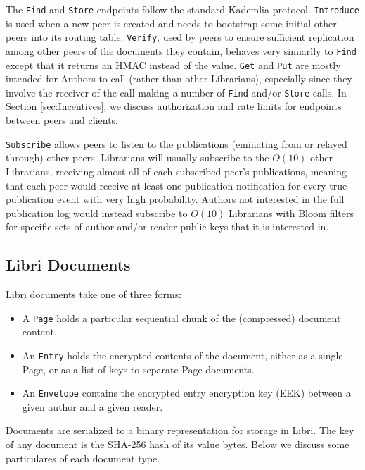 \documentclass[10pt]{article}
\newcommand{\ttt}[1]{\texttt{#1}}
\def\Entry{\ttt{Entry}}
\def\Page{\ttt{Page}}
\def\Envelope{\ttt{Envelope}}
\def\Put{\ttt{Put}}
\def\Get{\ttt{Get}}
\begin{document}
The \ttt{Find} and \texttt{Store} endpoints follow the standard Kademlia protocol. \texttt{Introduce} is used when a new peer is created and needs to bootstrap some initial other peers into its routing table. \texttt{Verify}, used by peers to ensure sufficient replication among other peers of the documents they contain, behaves very simiarlly to \texttt{Find} except that it returns an HMAC instead of the value. \Get{} and \Put{} are mostly intended for Authors to call (rather than other Librarians), especially since they involve the receiver of the call making a number of \texttt{Find} and/or \texttt{Store} calls. In Section \ref{sec:Incentives}, we discuss authorization and rate limits for endpoints between peers and clients.

\ttt{Subscribe} allows peers to listen to the publications (eminating from or relayed through) other peers. Librarians will usually subscribe to the $O(10)$ other Librarians, receiving almost all of each subscribed peer's publications, meaning that each peer would receive at least one publication notification for every true publication event with very high probability. Authors not interested in the full publication log would instead subscribe to $O(10)$ Librarians with Bloom filters for specific sets of author and/or reader public keys that it is interested in.

\subsection{Libri Documents}
\label{sec:Docs}
Libri documents take one of three forms:
\begin{itemize}
	\item A \Page{} holds a particular sequential chunk of the (compressed) document content. 
	\item An \Entry{} holds the encrypted contents of the document, either as a single Page, or as a list of keys to separate Page documents.
	\item An \Envelope{} contains the encrypted entry encryption key (EEK) between a given author and a given reader.
\end{itemize}
Documents are serialized to a binary representation for storage in Libri. The key of any document is the SHA-256 hash of its value bytes. Below we discuss some particulares of each document type.
\end{document}
